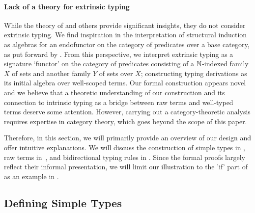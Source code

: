 \documentclass[BiSig.tex]{subfiles}
\begin{document}
\paragraph{Lack of a theory for extrinsic typing}
While the theory of \citet{Fiore1999} and others provide significant insights, they do not consider extrinsic typing.
We find inspiration in the interpretation of structural induction as algebras for an endofunctor on the category of predicates over a base category, as put forward by \citet{Hermida1998}.
From this perspective, we interpret extrinsic typing as a signature `functor' on the category of predicates consisting of a $\mathbb{N}$-indexed family $X$ of sets and another family $Y$ of sets over $X$; constructing typing derivations as its initial algebra over well-scoped terms.
Our formal construction appears novel and we believe that a theoretic understanding of our construction and its connection to intrinsic typing as a bridge between raw terms and well-typed terms deserve some attention.
However, carrying out a category-theoretic analysis requires expertise in category theory, which goes beyond the scope of this paper.

Therefore, in this section, we will primarily provide an overview of our design and offer intuitive explanations.
We will discuss the construction of simple types in , raw terms in~, and bidirectional typing rules in .
Since the formal proofs largely reflect their informal presentation, we will limit our illustration to the 'if' part of  as an example in .

\subsection{Defining Simple Types}\label{subsec:formal-simple-types}
\end{document}
